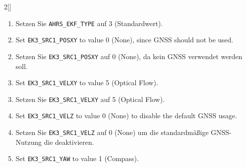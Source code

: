 \begin{paracol}{2}[]
\colger

\begin{enumerate}
\item Setzen Sie \texttt{AHRS\_EKF\_TYPE} auf 3 (Standardwert).
\end{enumerate}

\coleng

\begin{enumerate} 
\setcounter{enumi}{1}
\item Set \texttt{EK3\_SRC1\_POSXY} to value 0 (None), since GNSS should not be used.
\end{enumerate}

\colger

\begin{enumerate}
\setcounter{enumi}{1}
\item Setzen Sie \texttt{EK3\_SRC1\_POSXY} auf 0 (None), da kein GNSS verwendet werden soll.
\end{enumerate}

\coleng

\begin{enumerate} 
\setcounter{enumi}{2}
\item Set \texttt{EK3\_SRC1\_VELXY} to value 5 (Optical Flow).
\end{enumerate}

\colger

\begin{enumerate}
\setcounter{enumi}{2}
\item Setzen Sie \texttt{EK3\_SRC1\_VELXY} auf 5 (Optical Flow).
\end{enumerate}

\coleng

\begin{enumerate} 
\setcounter{enumi}{3}
\item Set \texttt{EK3\_SRC1\_VELZ} to value 0 (None) to disable the default GNSS usage.
\end{enumerate}

\colger

\begin{enumerate}
\setcounter{enumi}{3}
\item Setzen Sie \texttt{EK3\_SRC1\_VELZ} auf 0 (None) um die standardmäßige GNSS-Nutzung die deaktivieren.
\end{enumerate}

\coleng

\begin{enumerate} 
\setcounter{enumi}{4}
\item Set \texttt{EK3\_SRC1\_YAW} to value 1 (Compass).
\end{enumerate}


\end{paracol}
